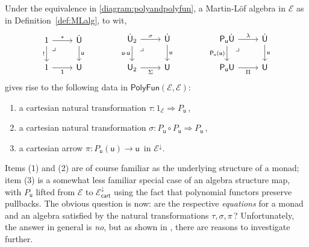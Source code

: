 \documentclass[12pt,reqno]{amsart}
\newcommand{\EE}{\ensuremath{\mathcal{E}}}
\newcommand{\alg}[1]{\ensuremath{\mathsf{#1}}}
\renewcommand{\t}{\ensuremath{\mathsf{u}}}
\newcommand{\T}{\ensuremath{\mathsf{U}}}
\newcommand{\TT}{\ensuremath{\dot{\mathsf{U}}}}
\newcommand{\pbcorner}{\arrow[dr,phantom,"\lrcorner" very near start, shift right=.5ex]} %
\theoremstyle{remark}
\theoremstyle{definition}
\begin{document}
Under the equivalence in \eqref{diagram:polyandpolyfun}, a Martin-L\"of algebra in $\EE$ as in Definition~\ref{def:MLalg}, to wit,
\begin{equation}\label{diag:MLalg2}
\begin{tikzcd}
	1 \ar[r,"*"] \ar[d,swap,"!"] \pbcorner &  \TT \ar[d, "\t"]\\  
	1 \ar[r, swap,"\mathsf{1}"] & \T
 \end{tikzcd}\qquad \qquad 
 \begin{tikzcd}
	\TT_2  \ar[r,"\sigma"] \ar[d,swap,"\t\cdot\t"] \pbcorner &  \TT \ar[d, "\t"]\\  
	\T_2 \ar[r,swap, "\Sigma"] & \T
\end{tikzcd} \qquad \qquad 
	 \begin{tikzcd}
	\alg{P}_\t\TT \ar[r,"\lambda"] \ar[d,swap,"\alg{P}_\t(\t)"] \pbcorner &  \TT \ar[d, "\t"]\\  
	\alg{P}_\t\T \ar[r,swap, "\Pi"] & \T
 \end{tikzcd} 
 \end{equation}
gives rise to the following data in $\mathsf{PolyFun}(\EE, \EE)$:
\begin{enumerate}
\item a cartesian natural transformation $\tau :1_\EE \Rightarrow P_\t$\,,
\item a cartesian natural transformation $\sigma :P_\t\circ P_\t \Rightarrow P_\t$\,,
\item a cartesian arrow $\pi:P_\t(\t) \rightarrow \t$\, in $\EE^{\downarrow}$.
\end{enumerate}
%
Items (1) and (2) are of course familiar as the underlying structure of a monad; item (3) is a somewhat less familiar special case of an algebra structure map, with $P_\t$ lifted from $\EE$ to $\EE^{\downarrow}_{\mathsf{cart}}$ using the fact that polynomial functors preserve pullbacks.  The obvious question is now: are the respective \emph{equations} for a monad and an algebra satisfied by the natural transformations $\tau, \sigma, \pi$\,?  Unfortunately, the answer in general is \emph{no}, but as shown in \cite{Newstead:thesis, NA:2018}, there are reasons to investigate further.
 
\end{document}
